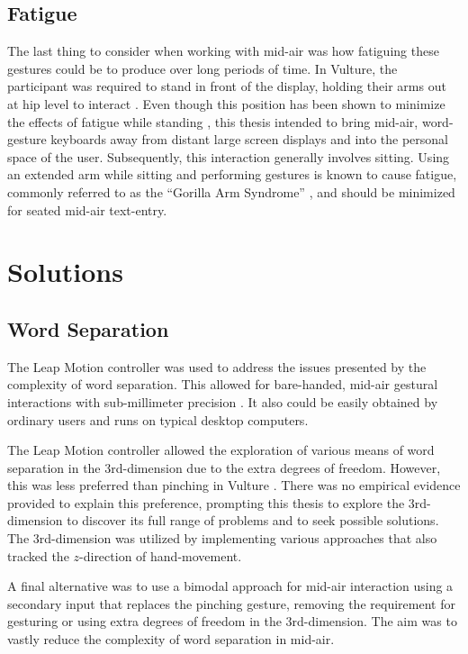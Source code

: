 \subsection{Fatigue}
The last thing to consider when working with mid-air was how fatiguing these gestures could be to produce over long periods of time. In Vulture, the participant was required to stand in front of the display, holding their arms out at hip level to interact \cite{ref_vulture}. Even though this position has been shown to minimize the effects of fatigue while standing \cite{ref_SEATO_layout_2}, this thesis intended to bring mid-air, word-gesture keyboards away from distant large screen displays and into the personal space of the user. Subsequently, this interaction generally involves sitting. Using an extended arm while sitting and performing gestures is known to cause fatigue, commonly referred to as the ``Gorilla Arm Syndrome'' \cite{ref_gorilla_arm,ref_fatigue_limitation}, and should be minimized for seated mid-air text-entry.

\section{Solutions}
\subsection{Word Separation}
The Leap Motion controller was used to address the issues presented by the complexity of word separation. This allowed for bare-handed, mid-air gestural interactions with sub-millimeter precision \cite{ref_leap_device_evaluation_1,ref_leap_device_evaluation_2}. It also could be easily obtained by ordinary users and runs on typical desktop computers.

The Leap Motion controller allowed the exploration of various means of word separation in the 3rd-dimension due to the extra degrees of freedom. However, this was less preferred than pinching in Vulture \cite{ref_vulture}. There was no empirical evidence provided to explain this preference, prompting this thesis to explore the 3rd-dimension to discover its full range of problems and to seek possible solutions. The 3rd-dimension was utilized by implementing various approaches that also tracked the $z$-direction of hand-movement.

A final alternative was to use a bimodal approach for mid-air interaction using a secondary input that replaces the pinching gesture, removing the requirement for gesturing or using extra degrees of freedom in the 3rd-dimension. The aim was to vastly reduce the complexity of word separation in mid-air.

